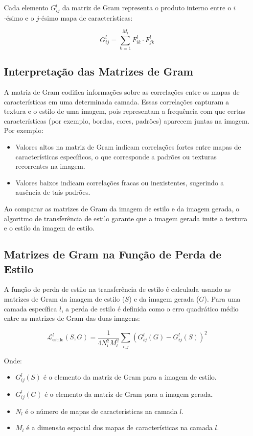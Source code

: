 \documentclass{tufte-handout}
\let\subsubsection\subsection
\begin{document}
Cada elemento $G^l_{ij}$ da matriz de Gram representa o produto interno entre o $i$-ésimo e o $j$-ésimo mapa de características:

\[
G^l_{ij} = \sum_{k=1}^{M_l} F^l_{ik} \cdot F^l_{jk}
\]

\subsubsection{Interpretação das Matrizes de Gram}

A matriz de Gram codifica informações sobre as correlações entre os mapas de características em uma determinada camada. Essas correlações capturam a textura e o estilo de uma imagem, pois representam a frequência com que certas características (por exemplo, bordas, cores, padrões) aparecem juntas na imagem. Por exemplo:
\begin{itemize}
    \item Valores altos na matriz de Gram indicam correlações fortes entre mapas de características específicos, o que corresponde a padrões ou texturas recorrentes na imagem.
    \item  Valores baixos indicam correlações fracas ou inexistentes, sugerindo a ausência de tais padrões.
\end{itemize}

Ao comparar as matrizes de Gram da imagem de estilo e da imagem gerada, o algoritmo de transferência de estilo garante que a imagem gerada imite a textura e o estilo da imagem de estilo.

\subsubsection{Matrizes de Gram na Função de Perda de Estilo}

A função de perda de estilo na transferência de estilo é calculada usando as matrizes de Gram da imagem de estilo ($S$) e da imagem gerada ($G$). Para uma camada específica $l$, a perda de estilo é definida como o erro quadrático médio entre as matrizes de Gram das duas imagens:

\[
\mathcal{L}_{\text{estilo}}^l (S, G) = \frac{1}{4N_l^2 M_l^2} \sum_{i,j} \left(G^l_{ij}(G) - G^l_{ij}(S)\right)^2
\]

Onde:
\begin{itemize}
    \item $G^l_{ij}(S)$ é o elemento da matriz de Gram para a imagem de estilo.
    \item $G^l_{ij}(G)$ é o elemento da matriz de Gram para a imagem gerada.
    \item $N_l$ é o número de mapas de características na camada $l$.
    \item $M_l$ é a dimensão espacial dos mapas de características na camada $l$.
\end{itemize}
\end{document}
